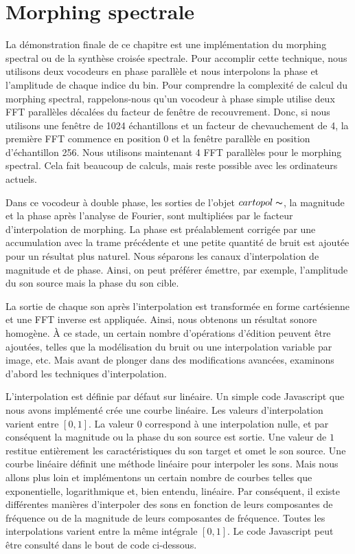 \section{Morphing spectrale}

La démonstration finale de ce chapitre est une implémentation du morphing spectral ou de la synthèse croisée spectrale. Pour accomplir cette technique, nous utilisons deux vocodeurs en phase parallèle et nous interpolons la phase et l’amplitude de chaque indice du bin. Pour comprendre la complexité de calcul du morphing spectral, rappelons-nous qu'un vocodeur à phase simple utilise deux FFT parallèles décalées du facteur de fenêtre de recouvrement. Donc, si nous utilisons une fenêtre de 1024 échantillons et un facteur de chevauchement de 4, la première FFT commence en position $ 0 $ et la fenêtre parallèle en position d’échantillon 256. Nous utilisons maintenant 4 FFT parallèles pour le morphing spectral. Cela fait beaucoup de calculs, mais reste possible avec les ordinateurs actuels.

Dans ce vocodeur à double phase, les sorties de l'objet $ cartopol \thicksim $, la magnitude et la phase après l'analyse de Fourier, sont multipliées par le facteur d'interpolation de morphing. La phase est préalablement corrigée par une accumulation avec la trame précédente et une petite quantité de bruit est ajoutée pour un résultat plus naturel. Nous séparons les canaux d’interpolation de magnitude et de phase. Ainsi, on peut préférer émettre, par exemple, l’amplitude du son source mais la phase du son cible.

La sortie de chaque son après l’interpolation est transformée en forme cartésienne et une FFT inverse est appliquée. Ainsi, nous obtenons un résultat sonore homogène. À ce stade, un certain nombre d'opérations d'édition peuvent être ajoutées, telles que la modélisation du bruit ou une interpolation variable par image, etc. Mais avant de plonger dans des modifications avancées, examinons d'abord les techniques d'interpolation.

L'interpolation est définie par défaut sur linéaire. Un simple code Javascript que nous avons implémenté crée une courbe linéaire. Les valeurs d'interpolation varient entre $ [0, 1] $. La valeur $ 0 $ correspond à une interpolation nulle, et par conséquent la magnitude ou la phase du son source est sortie. Une valeur de $ 1 $ restitue entièrement les caractéristiques du son target et omet le son source. Une courbe linéaire définit une méthode linéaire pour interpoler les sons. Mais nous allons plus loin et implémentons un certain nombre de courbes telles que exponentielle, logarithmique et, bien entendu, linéaire. Par conséquent, il existe différentes manières d'interpoler des sons en fonction de leurs composantes de fréquence ou de la magnitude de leurs composantes de fréquence. Toutes les interpolations varient entre la même intégrale $ [0, 1] $. Le code Javascript peut être consulté dans le bout de code ci-dessous.


